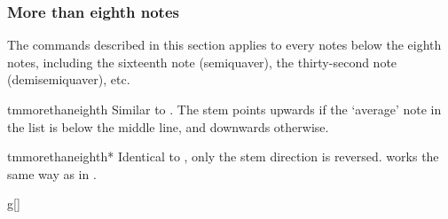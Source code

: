 \documentclass[11pt,a4paper]{ltxdoc}
\begin{document}
\subsubsection{More than eighth notes}\label{sec:music-notes:commands:more-than-eighth}
The commands described in this section applies to every notes below the eighth 
notes, including the sixteenth note (semiquaver), the thirty-second note 
(demisemiquaver), etc.
\begin{docCommand}{tmmorethaneighth}{}
  Similar to . The stem points upwards if the `average' note 
  in the list is below the middle line, and downwards otherwise.
\end{docCommand}
\begin{docCommand}{tmmorethaneighth*}{}
  Identical to , only the stem direction is reversed. 
   works the same way as in .
\end{docCommand}
\begin{dispExample}
\begin{tmsinglestaff}%
  \begin{tmstaff}{g}[]
  \end{tmstaff}%
\end{tmsinglestaff}
\end{dispExample}
\end{document}
